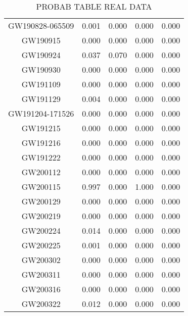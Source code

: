 \begin{table*}[]
\begin{tabular}{c|cc|cc}
GW190828-065509 &  0.001 &	0.000 &	0.000 &	0.000 \\
GW190915 &  0.000 &	0.000 &	0.000 &	0.000 \\
GW190924 &  0.037   &	0.070 & 0.000 &	0.000 \\
GW190930 &	0.000 &	 0.000 &	0.000 &	0.000 \\ 
GW191109 &	0.000 &	0.000 &	0.000 & 0.000 \\
GW191129 & 0.004 & 	0.000 &	0.000 & 0.000 \\
GW191204-171526 & 0.000 &	0.000	& 0.000 &	0.000 \\
GW191215 & 0.000 &	0.000 &	0.000 &	0.000 \\
GW191216 & 0.000 &	0.000 &	0.000 & 0.000 \\
GW191222 & 0.000 &	0.000 &	0.000 & 0.000 \\
GW200112 & 0.000 &	0.000 &	0.000 & 	0.000 \\
GW200115 &	0.997  & 0.000 &	1.000 &	0.000 \\
GW200129 & 0.000 &	0.000 &	0.000 &	0.000 \\
GW200219 & 0.000 &	0.000 &	0.000 	& 0.000 \\
GW200224 & 0.014 &	0.000 &	0.000 & 0.000 \\
GW200225 &  0.001 &	0.000 &	0.000 &	0.000 \\ 
GW200302   & 0.000 &	0.000 &	0.000 & 0.000 \\
GW200311 &	0.000 &	0.000 & 0.000 & 0.000 \\   
GW200316 & 0.000 &	0.000 &	0.000 & 0.000 \\
GW200322 & 0.012 &	0.000 &	0.000 &	0.000 \\


\hline
\end{tabular}
\caption{PROBAB TABLE REAL DATA}
\label{tab:real_data}
\end{table*}
